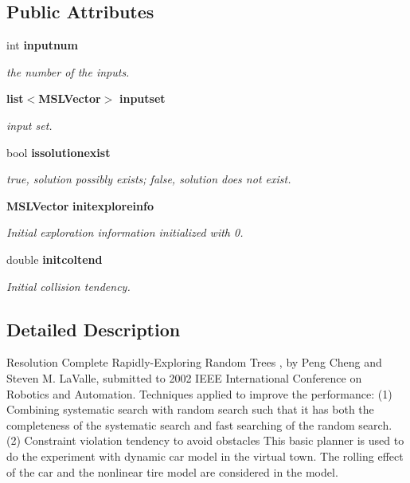 \subsection*{Public Attributes}
\begin{CompactItemize}
\item 
int {\bf inputnum}
\begin{CompactList}\small\item\em the number of the inputs.\item\end{CompactList}\item 
{\bf list}$<${\bf MSLVector}$>$ {\bf inputset}
\begin{CompactList}\small\item\em input set.\item\end{CompactList}\item 
bool {\bf issolutionexist}
\begin{CompactList}\small\item\em true, solution possibly exists; false, solution does not exist.\item\end{CompactList}\item 
{\bf MSLVector} {\bf initexploreinfo}
\begin{CompactList}\small\item\em Initial exploration information initialized with 0.\item\end{CompactList}\item 
double {\bf initcoltend}
\begin{CompactList}\small\item\em Initial collision tendency.\item\end{CompactList}\end{CompactItemize}


\subsection{Detailed Description}
Resolution Complete Rapidly-Exploring Random Trees , by Peng Cheng and Steven M. La\-Valle, submitted to 2002 IEEE International Conference on Robotics and Automation. Techniques applied to improve the performance: (1) Combining systematic search with random search such that it has both the completeness of the systematic search and fast searching of the random search. (2) Constraint violation tendency to avoid obstacles This basic planner is used to do the experiment with dynamic car model in the virtual town. The rolling effect of the car and the nonlinear tire model are considered in the model.



